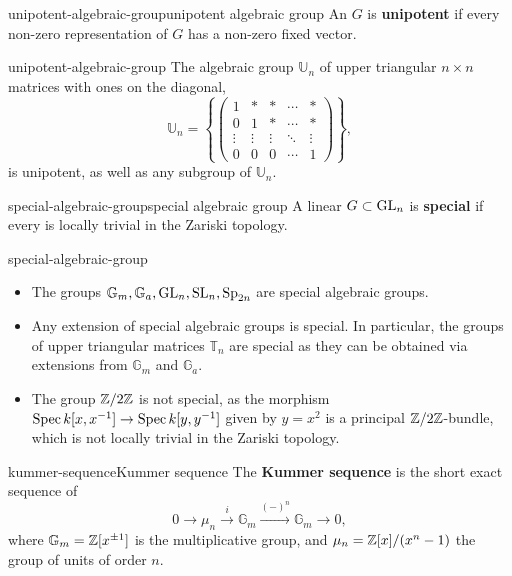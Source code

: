 \begin{topic}{unipotent-algebraic-group}{unipotent algebraic group}
    An  $G$ is \textbf{unipotent} if every non-zero representation of $G$ has a non-zero fixed vector.
\end{topic}

\begin{example}{unipotent-algebraic-group}
    The algebraic group $\mathbb{U}_n$ of upper triangular $n \times n$ matrices with ones on the diagonal,
    \[ \mathbb{U}_n = \left\{ \begin{pmatrix} 1 & * & * & \cdots & * \\ 0 & 1 & * & \cdots & * \\ \vdots & \vdots & \vdots & \ddots & \vdots \\ 0 & 0 & 0 & \cdots & 1 \end{pmatrix} \right\} , \]
    is unipotent, as well as any subgroup of $\mathbb{U}_n$.
\end{example}

\begin{topic}{special-algebraic-group}{special algebraic group}
    A linear  $G \subset \textup{GL}_n$ is \textbf{special} if every  is locally trivial in the Zariski topology.
\end{topic}

\begin{example}{special-algebraic-group}
    \begin{itemize}
        \item The groups $\mathbb{G}_m, \mathbb{G}_a, \textup{GL}_n, \textup{SL}_n, \textup{Sp}_{2n}$ are special algebraic groups.
        \item Any extension of special algebraic groups is special. In particular, the groups of upper triangular matrices $\mathbb{T}_n$ are special as they can be obtained via extensions from $\mathbb{G}_m$ and $\mathbb{G}_a$.
        \item The group $\mathbb{Z}/2\mathbb{Z}$ is not special, as the morphism $\operatorname{Spec} k[x, x^{-1}] \to \operatorname{Spec} k[y, y^{-1}]$ given by $y = x^2$ is a principal $\mathbb{Z}/2\mathbb{Z}$-bundle, which is not locally trivial in the Zariski topology.
    \end{itemize}
\end{example}

\begin{topic}{kummer-sequence}{Kummer sequence}
    The \textbf{Kummer sequence} is the short exact sequence of 
    \[ 0 \to \mu_n \xrightarrow{i} \mathbb{G}_m \xrightarrow{(-)^n} \mathbb{G}_m \to 0 , \]
    where $\mathbb{G}_m = \mathbb{Z}[x^{\pm 1}]$ is the multiplicative group, and $\mu_n = \mathbb{Z}[x] / (x^n - 1)$ the group of units of order $n$.
\end{topic}


